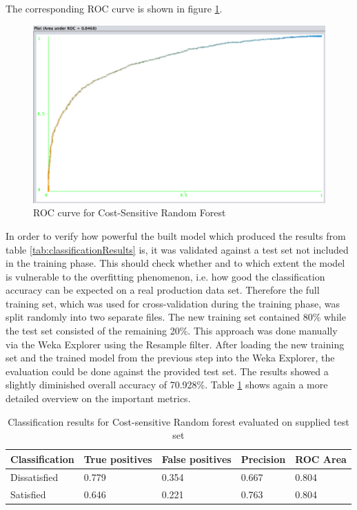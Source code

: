 The corresponding ROC curve is shown in figure \ref{fig:rocCurve}. 

\begin{figure}
	\centering
	\includegraphics[width=1.0\textwidth]{img/rocResultRF.png}
	\caption{ROC curve for Cost-Sensitive Random Forest}
	\label{fig:rocCurve}
\end{figure}

In order to verify how powerful the built model which produced the results from table \ref{tab:classificationResults} is, it was validated against a test set not included in the training phase. This should check whether and to which extent the model is vulnerable to the overfitting phenomenon, i.e. how good the classification accuracy can be expected on a real production data set. Therefore the full training set, which was used for cross-validation during the training phase, was split randomly into two separate files. The new training set contained 80\% while the test set consisted of the remaining 20\%. This approach was done manually via the Weka Explorer using the Resample filter. After loading the new training set and the trained model from the previous step into the Weka Explorer, the evaluation could be done against the provided test set. The results showed a slightly diminished overall accuracy of 70.928\%. Table \ref{tab:testResults} shows again a more detailed overview on the important metrics.

\begin{table}[]
	\centering
	\begin{tabular}{|l|l|l|l|l|}
		\hline
		\textbf{Classification} & \textbf{True positives} & \textbf{False positives} & \textbf{Precision} & \textbf{ROC Area} \\ \hline
		Dissatisfied            & 0.779                   & 0.354                    & 0.667              & 0.804             \\ \hline
		Satisfied               & 0.646                   & 0.221                    & 0.763                & 0.804             \\ \hline
	\end{tabular}
	\caption{Classification results for Cost-sensitive Random forest evaluated on supplied test set}
	\label{tab:testResults}
\end{table}

